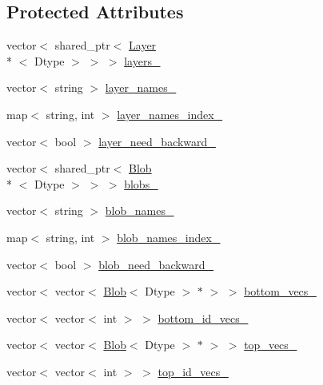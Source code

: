\subsection*{Protected Attributes}
\begin{DoxyCompactItemize}
\item 
vector$<$ shared\+\_\+ptr$<$ \hyperlink{classcaffe_1_1_layer}{Layer}\\*
$<$ Dtype $>$ $>$ $>$ \hyperlink{classcaffe_1_1_net_ab9e30392aa01dcf182d1a5cbd34ec45e}{layers\+\_\+}
\item 
vector$<$ string $>$ \hyperlink{classcaffe_1_1_net_ac792353f3cac826d97feea4b9eff3dff}{layer\+\_\+names\+\_\+}
\item 
map$<$ string, int $>$ \hyperlink{classcaffe_1_1_net_a41db3e5f1fd7a28c58a2c605a6af0c3b}{layer\+\_\+names\+\_\+index\+\_\+}
\item 
vector$<$ bool $>$ \hyperlink{classcaffe_1_1_net_a4c4dbb09376c663637e2444a4fd452b0}{layer\+\_\+need\+\_\+backward\+\_\+}
\item 
vector$<$ shared\+\_\+ptr$<$ \hyperlink{classcaffe_1_1_blob}{Blob}\\*
$<$ Dtype $>$ $>$ $>$ \hyperlink{classcaffe_1_1_net_ab033c0574fcbf1e67e22b9682677c64d}{blobs\+\_\+}
\item 
vector$<$ string $>$ \hyperlink{classcaffe_1_1_net_a0055d38b35ea1a2f44bd400dd6d10846}{blob\+\_\+names\+\_\+}
\item 
map$<$ string, int $>$ \hyperlink{classcaffe_1_1_net_a45f232e36045689438a7e1d869ed399c}{blob\+\_\+names\+\_\+index\+\_\+}
\item 
vector$<$ bool $>$ \hyperlink{classcaffe_1_1_net_a16cedebd7cc82e0b3a30617b71d4c3f7}{blob\+\_\+need\+\_\+backward\+\_\+}
\item 
vector$<$ vector$<$ \hyperlink{classcaffe_1_1_blob}{Blob}$<$ Dtype $>$ $\ast$ $>$ $>$ \hyperlink{classcaffe_1_1_net_ac5bf2007047f749d9d111b0dfa220afc}{bottom\+\_\+vecs\+\_\+}
\item 
vector$<$ vector$<$ int $>$ $>$ \hyperlink{classcaffe_1_1_net_a49ce49e288297963f0d9f7a6d790daa6}{bottom\+\_\+id\+\_\+vecs\+\_\+}
\item 
vector$<$ vector$<$ \hyperlink{classcaffe_1_1_blob}{Blob}$<$ Dtype $>$ $\ast$ $>$ $>$ \hyperlink{classcaffe_1_1_net_aa834096a02382d9a881bf33694e72564}{top\+\_\+vecs\+\_\+}
\item 
vector$<$ vector$<$ int $>$ $>$ \hyperlink{classcaffe_1_1_net_aacacd1d6a07c61694433d4ce5ca8b0be}{top\+\_\+id\+\_\+vecs\+\_\+}
\item 

\end{DoxyCompactItemize}
